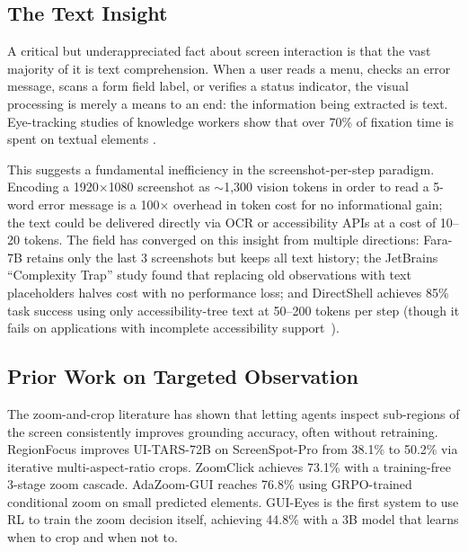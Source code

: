 \documentclass[11pt,a4paper]{article}
\begin{document}
\subsection{The Text Insight}
\label{sec:intro-text-insight}

A critical but underappreciated fact about screen interaction is that the vast majority of it is text comprehension.
When a user reads a menu, checks an error message, scans a form field label, or verifies a status indicator, the visual processing is merely a means to an end: the information being extracted is text.
Eye-tracking studies of knowledge workers show that over 70\% of fixation time is spent on textual elements \cite{rayner-eye-movements}.

This suggests a fundamental inefficiency in the screenshot-per-step paradigm.
Encoding a 1920$\times$1080 screenshot as $\sim$1{,}300 vision tokens in order to read a 5-word error message is a 100$\times$ overhead in token cost for no informational gain; the text could be delivered directly via OCR or accessibility APIs at a cost of 10--20 tokens.
The field has converged on this insight from multiple directions: Fara-7B \cite{fara-7b} retains only the last 3 screenshots but keeps all text history; the JetBrains ``Complexity Trap'' study \cite{jetbrains-complexity-trap} found that replacing old observations with text placeholders halves cost with no performance loss; and DirectShell \cite{directshell} achieves 85\% task success using only accessibility-tree text at 50--200 tokens per step (though it fails on applications with incomplete accessibility support~\cite{screen2ax}).

\subsection{Prior Work on Targeted Observation}
\label{sec:intro-prior-work}

The zoom-and-crop literature has shown that letting agents inspect sub-regions of the screen consistently improves grounding accuracy, often without retraining.
RegionFocus \cite{regionfocus} improves UI-TARS-72B on ScreenSpot-Pro from 38.1\% to 50.2\% via iterative multi-aspect-ratio crops.
ZoomClick \cite{zoomclick} achieves 73.1\% with a training-free 3-stage zoom cascade.
AdaZoom-GUI \cite{adazoom-gui} reaches 76.8\% using GRPO-trained conditional zoom on small predicted elements.
GUI-Eyes \cite{gui-eyes} is the first system to use RL to train the zoom decision itself, achieving 44.8\% with a 3B model that learns when to crop and when not to.
\end{document}

